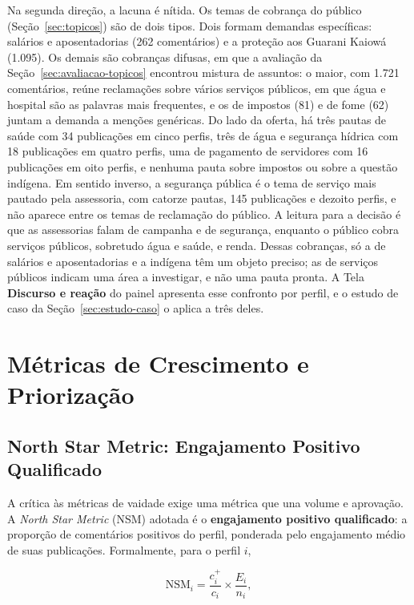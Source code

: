 Na segunda direção, a lacuna é nítida. Os temas de cobrança do público (Seção~\ref{sec:topicos}) são de dois tipos. Dois formam demandas específicas: salários e aposentadorias (262 comentários) e a proteção aos Guarani Kaiowá (1.095). Os demais são cobranças difusas, em que a avaliação da Seção~\ref{sec:avaliacao-topicos} encontrou mistura de assuntos: o maior, com 1.721 comentários, reúne reclamações sobre vários serviços públicos, em que água e hospital são as palavras mais frequentes, e os de impostos (81) e de fome (62) juntam a demanda a menções genéricas. Do lado da oferta, há três pautas de saúde com 34 publicações em cinco perfis, três de água e segurança hídrica com 18 publicações em quatro perfis, uma de pagamento de servidores com 16 publicações em oito perfis, e nenhuma pauta sobre impostos ou sobre a questão indígena. Em sentido inverso, a segurança pública é o tema de serviço mais pautado pela assessoria, com catorze pautas, 145 publicações e dezoito perfis, e não aparece entre os temas de reclamação do público. A leitura para a decisão é que as assessorias falam de campanha e de segurança, enquanto o público cobra serviços públicos, sobretudo água e saúde, e renda. Dessas cobranças, só a de salários e aposentadorias e a indígena têm um objeto preciso; as de serviços públicos indicam uma área a investigar, e não uma pauta pronta. A Tela \textbf{Discurso e reação} do painel apresenta esse confronto por perfil, e o estudo de caso da Seção~\ref{sec:estudo-caso} o aplica a três deles.


\section{Métricas de Crescimento e Priorização}\label{sec:metricas}

\subsection{North Star Metric: Engajamento Positivo Qualificado}\label{sec:nsm}

A crítica às métricas de vaidade \cite{feroz2024} exige uma métrica que una volume e aprovação. A \emph{North Star Metric} (NSM) adotada é o \textbf{engajamento positivo qualificado}: a proporção de comentários positivos do perfil, ponderada pelo engajamento médio de suas publicações. Formalmente, para o perfil $i$,

\begin{equation}
\mathrm{NSM}_i = \frac{c^{+}_i}{c_i} \times \frac{E_i}{n_i},
\label{eq:nsm}
\end{equation}


